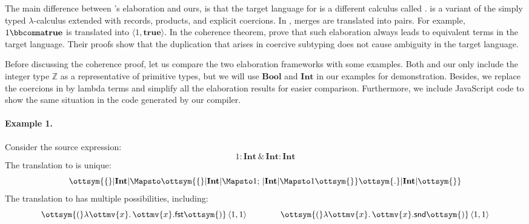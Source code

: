 The main difference between  \citeauthor{bi2018essence}'s elaboration and ours,
is that the target language for \necolus is a different calculus called
\lambdac. \lambdac is a variant of the simply typed $\lambda$-calculus extended
with records, products, and explicit coercions. In \necolus, merges are
translated into pairs. For example, $1  \bbcomma   \mathbf{true} $ is translated into
$ \langle  1 ,   \mathbf{true}   \rangle $. In the coherence theorem, \citeauthor{bi2018essence} prove that
such elaboration always leads to equivalent terms in the target language. Their
proofs show that the duplication that arises in coercive subtyping does not
cause ambiguity in the target language.

Before discussing the coherence proof, let us compare the two elaboration
frameworks with some examples. Both \lambdac and our \lambdar only include the
integer type $ \mathbb{Z} $ as a representative of primitive types, but we will use
$ \mathbf{Bool} $ and $ \mathbf{Int} $ in our examples for demonstration. Besides, we replace
the coercions in \lambdac by lambda terms and simplify all the elaboration
results for easier comparison. Furthermore, we include JavaScript code to show
the same situation in the code generated by our compiler.

\paragraph{Example 1.}
Consider the source expression:
\[
  1  :   \mathbf{Int}   \, {\&} \,   \mathbf{Int}   :   \mathbf{Int} 
\]
The translation to \lambdar is unique:
\[
  \ottsym{\{}   |  \mathbf{Int}  |   \Mapsto  \ottsym{\{}   |  \mathbf{Int}  |   \Mapsto  1  ; \,   |  \mathbf{Int}  |   \Mapsto  1  \ottsym{\}}  \ottsym{.}   |  \mathbf{Int}  |   \ottsym{\}}
\]
The translation to \lambdac has multiple possibilities, including:
\[
  \ottsym{(}    \lambda \ottmv{x} .\, \ottmv{x}   . \mathsf{fst}   \ottsym{)} \,  \langle  1 ,  1  \rangle  \qquad\qquad \ottsym{(}    \lambda \ottmv{x} .\, \ottmv{x}   . \mathsf{snd}   \ottsym{)} \,  \langle  1 ,  1  \rangle 
\]

